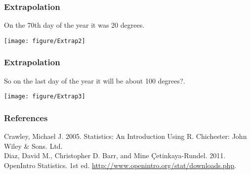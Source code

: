 \documentclass{beamer}\usepackage{graphicx, color}
\makeatletter
\def\maxwidth{ %
  \ifdim\Gin@nat@width>\linewidth
    \linewidth
  \else
    \Gin@nat@width
  \fi
}
\newenvironment{knitrout}{}{} %
\makeatother
\begin{document}
\begin{frame}[fragile]
  \frametitle{Extrapolation}
  On the 70th day of the year it was 20 degrees.
\begin{knitrout}
\color{fgcolor}

{\centering \texttt{[image: figure/Extrap2]} 

}


\end{knitrout}

\end{frame}

\begin{frame}[fragile]
  \frametitle{Extrapolation}
  So on the last day of the year it will be about 100 degrees?.
\begin{knitrout}
\color{fgcolor}

{\centering \texttt{[image: figure/Extrap3]} 

}


\end{knitrout}

\end{frame}






\begin{frame}[allowframebreaks]
  \frametitle{References}
  Crawley, Michael J. 2005. Statistics: An Introduction Using R. Chichester: John Wiley & Sons. Ltd. \\[0.25cm]
  Diaz, David M., Christopher D. Barr, and Mine \c{C}etinkaya-Rundel. 2011. OpenIntro Statistics. 1st ed. \url{http://www.openintro.org/stat/downloads.php}. \\[0.25cm] 
\end{frame}
\end{document}
